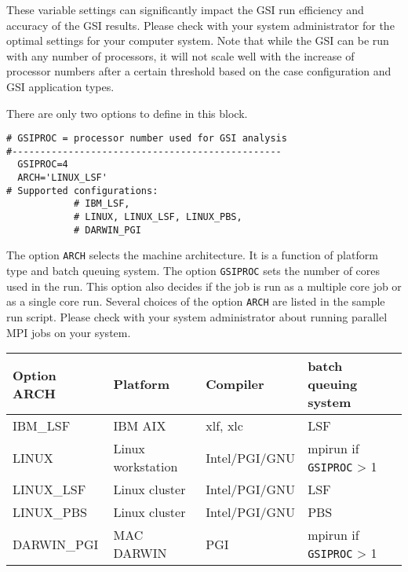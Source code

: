 These variable settings can significantly impact the GSI run efficiency and accuracy of the GSI results. Please check with your system administrator for the optimal settings for your computer system. Note that while the GSI can be run with any number of processors, it will not scale well with the increase of processor numbers after a certain threshold based on the case configuration and GSI application types.


There are only two options to define in this block. 

\begin{footnotesize}
\begin{verbatim}
# GSIPROC = processor number used for GSI analysis
#------------------------------------------------
  GSIPROC=4
  ARCH='LINUX_LSF'
# Supported configurations:
            # IBM_LSF,
            # LINUX, LINUX_LSF, LINUX_PBS,
            # DARWIN_PGI
\end{verbatim}
\end{footnotesize}

The option \verb|ARCH| selects the machine architecture. It is a function of platform type and batch queuing system. The option \verb|GSIPROC| sets the number of cores used in the run. This option also decides if the job is run as a multiple core job or as a single core run. Several choices of the option \verb|ARCH| are listed in the sample run script. Please check with your system administrator about running parallel MPI jobs on your system.

\begin{table}[htbp]
\centering
\begin{footnotesize}
\begin{tabular}{|p{3cm}|p{4cm}|p{3cm}|p{4cm}|}
\hline
\hline
Option ARCH & Platform & Compiler & batch queuing system \\
\hline
\hline
IBM\_LSF & IBM AIX & xlf, xlc & LSF \\
\hline
LINUX & Linux workstation & Intel/PGI/GNU & mpirun if \verb|GSIPROC| > 1 \\
\hline
LINUX\_LSF & Linux cluster & Intel/PGI/GNU & LSF \\
\hline
LINUX\_PBS & Linux cluster & Intel/PGI/GNU & PBS \\
\hline
DARWIN\_PGI & MAC DARWIN & PGI	& mpirun if \verb|GSIPROC| > 1 \\
\hline
\end{tabular}
\label{t36}
\end{footnotesize}
\end{table} 

